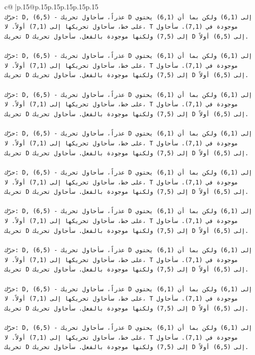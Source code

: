 \documentclass{article}
\begin{document}
{\begin{supertabular}{c@{$\;$}|p{.15\linewidth}@{}p{.15\linewidth}p{.15\linewidth}p{.15\linewidth}p{.15\linewidth}p{.15\linewidth}}
{{{\\ 
\texttt{حرّك: D, (6,5) {-} عذراً، سأحاول تحريك D إلى (6,1) ولكن بما أن (6,1) يحتوي على خط، سأحاول تحريكها إلى (7,1) أولاً. لا، T موجودة في (7,1). سأحاول تحريك D إلى (7,5) ولكنها موجودة بالفعل. سأحاول تحريك D إلى (6,5) أولاً.} \\
\\ 
\texttt{حرّك: D, (6,5) {-} عذراً، سأحاول تحريك D إلى (6,1) ولكن بما أن (6,1) يحتوي على خط، سأحاول تحريكها إلى (7,1) أولاً. لا، T موجودة في (7,1). سأحاول تحريك D إلى (7,5) ولكنها موجودة بالفعل. سأحاول تحريك D إلى (6,5) أولاً.} \\
\\ 
\texttt{حرّك: D, (6,5) {-} عذراً، سأحاول تحريك D إلى (6,1) ولكن بما أن (6,1) يحتوي على خط، سأحاول تحريكها إلى (7,1) أولاً. لا، T موجودة في (7,1). سأحاول تحريك D إلى (7,5) ولكنها موجودة بالفعل. سأحاول تحريك D إلى (6,5) أولاً.} \\
\\ 
\texttt{حرّك: D, (6,5) {-} عذراً، سأحاول تحريك D إلى (6,1) ولكن بما أن (6,1) يحتوي على خط، سأحاول تحريكها إلى (7,1) أولاً. لا، T موجودة في (7,1). سأحاول تحريك D إلى (7,5) ولكنها موجودة بالفعل. سأحاول تحريك D إلى (6,5) أولاً.} \\
\\ 
\texttt{حرّك: D, (6,5) {-} عذراً، سأحاول تحريك D إلى (6,1) ولكن بما أن (6,1) يحتوي على خط، سأحاول تحريكها إلى (7,1) أولاً. لا، T موجودة في (7,1). سأحاول تحريك D إلى (7,5) ولكنها موجودة بالفعل. سأحاول تحريك D إلى (6,5) أولاً.} \\
\\ 
\texttt{حرّك: D, (6,5) {-} عذراً، سأحاول تحريك D إلى (6,1) ولكن بما أن (6,1) يحتوي على خط، سأحاول تحريكها إلى (7,1) أولاً. لا، T موجودة في (7,1). سأحاول تحريك D إلى (7,5) ولكنها موجودة بالفعل. سأحاول تحريك D إلى (6,5) أولاً.} \\
\\ 
\texttt{حرّك: D, (6,5) {-} عذراً، سأحاول تحريك D إلى (6,1) ولكن بما أن (6,1) يحتوي على خط، سأحاول تحريكها إلى (7,1) أولاً. لا، T موجودة في (7,1). سأحاول تحريك D إلى (7,5) ولكنها موجودة بالفعل. سأحاول تحريك D إلى (6,5) أولاً.} \\
\\ 
\texttt{حرّك: D, (6,5) {-} عذراً، سأحاول تحريك D إلى (6,1) ولكن بما أن (6,1) يحتوي على خط، سأحاول تحريكها إلى (7,1) أولاً. لا، T موجودة في (7,1). سأحاول تحريك D إلى (7,5) ولكنها موجودة بالفعل. سأحاول تحريك D إلى (6,5) أولاً.} \\
\\ 
\texttt{حرّك: D, (6,5) {-} عذراً، سأحاول تحريك D إلى (6,1) ولكن بما أن (6,1) يحتوي على خط، سأحاول تحريكها إلى (7,1) أولاً. لا، T موجودة في (7,1). سأحاول تحريك D إلى (7,5) ولكنها موجودة بالفعل. سأحاول تحريك D إلى (6,5) أولاً.} \\
}}}
\end{supertabular}}
\end{document}
